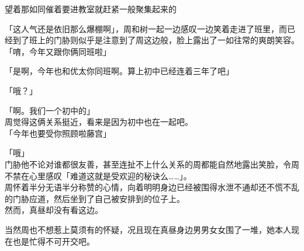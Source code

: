 望着那如同催着要进教室就赶紧一般聚集起来的

「这人气还是依旧那么爆棚啊」，周和树一起一边感叹一边笑着走进了班里，而已经到了班上的门胁则似乎是注意到了周这边般，脸上露出了一如往常的爽朗笑容。\\

「唷，今年又跟你俩同班啦」

「是啊，今年也和优太你同班啊。算上初中已经连着三年了吧」

「哦？」

「啊。我们一个初中的」\\

周觉得这俩关系挺近，看来是因为初中也在一起吧。\\

「今年也要受你照顾啦藤宫」

「哦」\\

门胁他不论对谁都很友善，甚至连扯不上什么关系的周都能自然地露出笑脸，令周不禁在心里感叹「难道这就是受欢迎的秘诀么……」。\\

周怀着半分无语半分称赞的心情，向着明明身边已经被围得水泄不通却还不慌不乱的门胁应道，然后坐到了自己被安排到的位子上。\\

然而，真昼却没有看这边。

当然周也不想惹上莫须有的怀疑，况且现在真昼身边男男女女围了一堆，她本人现在也是忙得不可开交吧。

